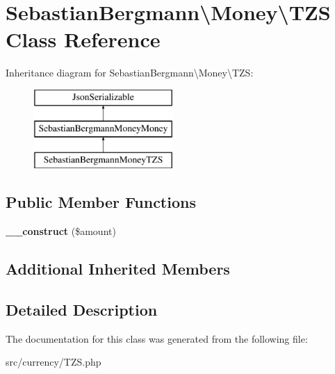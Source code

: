 \hypertarget{classSebastianBergmann_1_1Money_1_1TZS}{}\section{Sebastian\+Bergmann\textbackslash{}Money\textbackslash{}T\+Z\+S Class Reference}
\label{classSebastianBergmann_1_1Money_1_1TZS}
Inheritance diagram for Sebastian\+Bergmann\textbackslash{}Money\textbackslash{}T\+Z\+S\+:\begin{figure}[H]
\begin{center}
\leavevmode
\includegraphics[height=3.000000cm]{classSebastianBergmann_1_1Money_1_1TZS}
\end{center}
\end{figure}
\subsection*{Public Member Functions}
\begin{DoxyCompactItemize}
\item 
\hypertarget{classSebastianBergmann_1_1Money_1_1TZS_a6cd9808d9ae0d98b1c2201a85bd78c25}{}{\bfseries \+\_\+\+\_\+construct} (\$amount)\label{classSebastianBergmann_1_1Money_1_1TZS_a6cd9808d9ae0d98b1c2201a85bd78c25}

\end{DoxyCompactItemize}
\subsection*{Additional Inherited Members}


\subsection{Detailed Description}


The documentation for this class was generated from the following file\+:\begin{DoxyCompactItemize}
\item 
src/currency/T\+Z\+S.\+php\end{DoxyCompactItemize}
